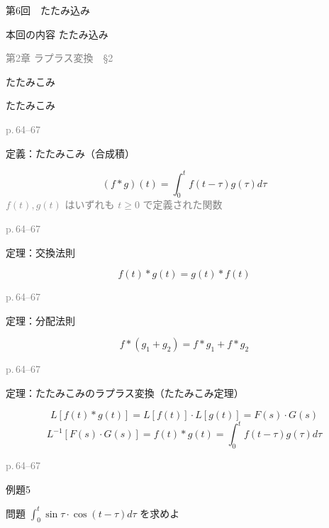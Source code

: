 \documentclass[aspectratio=43,professionalfonts,handout]{beamer}
\begin{document}
\begin{frame}{第6回　たたみ込み}
  \begin{block}{本回の内容}
  たたみ込み
  \end{block}
  \vfill\hfill{\scriptsize \textcolor{gray}{第2章 ラプラス変換　§2}}
\end{frame}

\begin{frame}{たたみこみ}
  \begin{block}{}
  {\large たたみこみ}
  \end{block}
  \vfill\hfill{\scriptsize \textcolor{gray}{p.\,64--67}}
\end{frame}

\begin{frame}{定義：たたみこみ（合成積）}
  \begin{block}{}
  \[
    (f * g)(t) = \int_{0}^t f(t-\tau)g(\tau) d\tau
  \]
  {\footnotesize \textcolor{gray}{$f(t), g(t)$ はいずれも $t \geq 0$ で定義された関数}}
  \end{block}
  \vfill\hfill{\scriptsize \textcolor{gray}{p.\,64--67}}
\end{frame}

\begin{frame}{定理：交換法則}
  \begin{block}{}
  \[
    f(t) * g(t) = g(t) * f(t)
  \]
  \end{block}
  \vfill\hfill{\scriptsize \textcolor{gray}{p.\,64--67}}
\end{frame}

\begin{frame}{定理：分配法則}
  \begin{block}{}
  \[
    f * (g_{1} + g_{2}) = f*g_{1} + f*g_{2}
  \]
  \end{block}
  \vfill\hfill{\scriptsize \textcolor{gray}{p.\,64--67}}
\end{frame}

\begin{frame}{定理：たたみこみのラプラス変換（たたみこみ定理）}
  \begin{block}{}
  \[
    L[f(t) * g(t)] = L[f(t)] \cdot L[g(t)] = F(s) \cdot G(s)
  \]
  \[
    L^{-1}[F(s) \cdot G(s)] = f(t) * g(t) = \int_{0}^t f(t-\tau)g(\tau) d\tau
  \]
  \end{block}
  \vfill\hfill{\scriptsize \textcolor{gray}{p.\,64--67}}
\end{frame}

\begin{frame}{例題5}
  \begin{exampleblock}{問題}
    $\int_{0}^t \sin \tau \cdot \cos(t-\tau) d\tau$ を求めよ\\[2pt]
  \end{exampleblock}
\end{frame}
\end{document}
